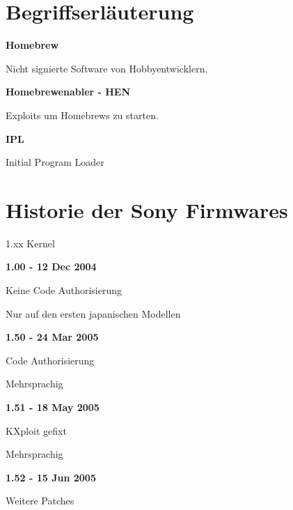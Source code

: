 \documentclass[mode=print,paper=screen,style=jefka]{powerdot}
\begin{document}
\section{Begriffserläuterung}
\begin{slide}{}
	\begin{LARGE}\textbf{Homebrew}\end{LARGE}\linebreak
	Nicht signierte Software von Hobbyentwicklern.\linebreak
	\linebreak
	\begin{LARGE}\textbf{Homebrewenabler - HEN}\end{LARGE}\linebreak
	Exploits um Homebrews zu starten.\linebreak
	\linebreak
	\begin{LARGE}\textbf{IPL}\end{LARGE}\linebreak
	Initial Program Loader
\end{slide}



\section{Historie der Sony Firmwares}
\begin{slide}{1.xx Kernel}
	\begin{large}\textbf{1.00 - 12 Dec 2004}\end{large}
	\begin{list}{-}{}
		\item{Keine Code Authorisierung}
		\item{Nur auf den ersten japanischen Modellen}
	\end{list}
	\begin{large}\textbf{1.50 - 24 Mar 2005}\end{large}
	\begin{list}{-}{}
		\item{Code Authorisierung}
		\item{Mehrsprachig}
	\end{list}
	\begin{large}\textbf{1.51 - 18 May 2005}\end{large}
	\begin{list}{-}{}
		\item{KXploit gefixt}
		\item{Mehrsprachig}
	\end{list}
	\begin{large}\textbf{1.52 - 15 Jun 2005}\end{large}
	\begin{list}{-}{}
		\item{Weitere Patches}
	\end{list}
\end{slide}
\end{document}
